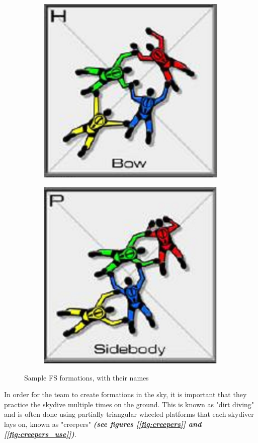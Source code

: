 \documentclass[adpaper,12pt]{book}
\begin{document}
\begin{figure}[H]
\begin{subfigure}{.33\textwidth}
	\end{subfigure}%
	\begin{subfigure}{.33\textwidth}
		\centering
		\includegraphics[width=0.9\linewidth]{FS_Bow.png}
	\end{subfigure}%
	\begin{subfigure}{.33\textwidth}
		\centering
		\includegraphics[width=0.9\linewidth]{FS_Sidebody.png}
	\end{subfigure}%
	\caption{Sample FS formations, with their names}
	\label{fig:sample_fs}
\end{figure}
%
In order for the team to create formations in the sky, it is important that they practice the skydive multiple times on the ground. This is known as "dirt diving" and is often done using partially triangular wheeled platforms that each skydiver lays on, known as "creepers"  \textbf{\emph{(see figures [\ref{fig:creepers}] and [\ref{fig:creepers_use}])}}.
\end{document}
